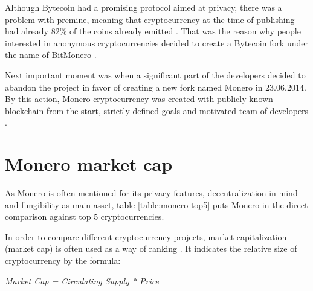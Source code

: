 \documentclass[
  printed, %
  table,   %
  nolof,     %
  nolot,     %
           oneside, color
]{fithesis3}
\begin{document}
Although Bytecoin had a promising protocol aimed at privacy, there was a problem with premine, meaning that cryptocurrency at the time of publishing had already 82\% of the coins already emitted \cite{fluffyponyonbytecoin}.
That was the reason why people interested in anonymous cryptocurrencies decided to create a Bytecoin fork under the name of BitMonero \cite{bitmonero}. 



Next important moment was when a significant part of the developers decided to abandon the project in favor of creating a new fork named Monero in 23.06.2014. By this action, Monero cryptocurrency was created with publicly known blockchain from the start, strictly defined goals and motivated team of developers \cite{monerofork}.


\section{Monero market cap}
 As Monero is often mentioned for its privacy features, decentralization in mind and fungibility as main asset, table \ref{table:monero-top5} puts Monero in the direct comparison against top 5 cryptocurrencies.

In order to compare different cryptocurrency projects, market capitalization (market cap) is often used as a way of ranking \cite{elbahrawy2017evolutionary}. It indicates the relative size of cryptocurrency by the formula: \\ \centerline{
 \textit{\textit{Market Cap = Circulating Supply * Price} }}
 
\end{document}
